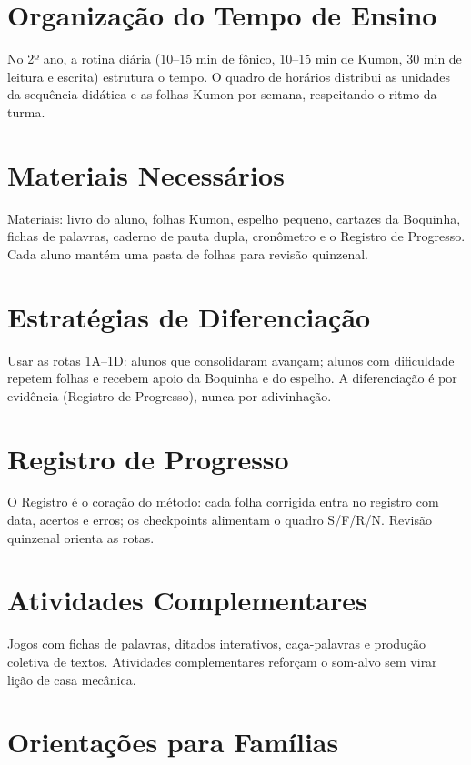 
\chapter{Organização do Tempo de Ensino}

No 2º ano, a rotina diária (10–15 min de fônico, 10–15 min de Kumon, 30 min de leitura e escrita) estrutura o tempo. O quadro de horários distribui as unidades da sequência didática e as folhas Kumon por semana, respeitando o ritmo da turma.


\chapter{Materiais Necessários}

Materiais: livro do aluno, folhas Kumon, espelho pequeno, cartazes da Boquinha, fichas de palavras, caderno de pauta dupla, cronômetro e o Registro de Progresso. Cada aluno mantém uma pasta de folhas para revisão quinzenal.


\chapter{Estratégias de Diferenciação}

Usar as rotas 1A–1D: alunos que consolidaram avançam; alunos com dificuldade repetem folhas e recebem apoio da Boquinha e do espelho. A diferenciação é por evidência (Registro de Progresso), nunca por adivinhação.


\chapter{Registro de Progresso}

O Registro é o coração do método: cada folha corrigida entra no registro com data, acertos e erros; os checkpoints alimentam o quadro S/F/R/N. Revisão quinzenal orienta as rotas.


\chapter{Atividades Complementares}

Jogos com fichas de palavras, ditados interativos, caça-palavras e produção coletiva de textos. Atividades complementares reforçam o som-alvo sem virar lição de casa mecânica.


\chapter{Orientações para Famílias}

